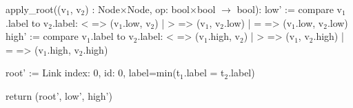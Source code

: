 \begin{blstlisting}
  apply_root((v$_1$, v$_2$) : Node$\times$Node, op: bool$\times$bool $\rightarrow$ bool):
    low' := compare v$_1$.label to v$_2$.label:  <  => (v$_1$.low, v$_2$)
                                      | > => (v$_1$, v$_2$.low)
                                      | = => (v$_1$.low, v$_2$.low)
    high' := compare v$_1$.label to v$_2$.label:  <  => (v$_1$.high, v$_2$)
                                       | > => (v$_1$, v$_2$.high)
                                       | = => (v$_1$.high, v$_2$.high)

    root' := Link{ index: 0, id: 0, label=min(t$_1$.label = t$_2$.label) }

    return (root', low', high')
\end{blstlisting}
